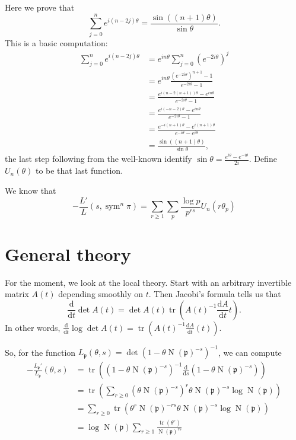 \documentclass{article}
\DeclareMathOperator{\norm}{N}
\DeclareMathOperator{\sym}{sym}
\DeclareMathOperator{\trace}{tr}
\newcommand{\fp}{\mathfrak{p}}
\newcommand{\dd}{\mathrm{d}}
\begin{document}
Here we prove that 
\[
	\sum_{j=0}^n e^{i(n-2j)\theta} = \frac{\sin((n+1)\theta)}{\sin\theta} .
\]
This is a basic computation:
\begin{align*}
	\sum_{j=0}^n e^{i(n-2j)\theta} 
		&= e^{in\theta} \sum_{j=0}^n (e^{-2i\theta})^j \\
		&= e^{i n \theta} \frac{(e^{-2i\theta})^{n+1}-1}{e^{-2i\theta}-1} \\
		&= \frac{e^{i(n-2(n+1))\theta}-e^{i n\theta}}{e^{-2i\theta}-1} \\
		&= \frac{e^{i(-n-2)\theta}-e^{i n\theta}}{e^{-2i\theta}-1} \\
		&= \frac{e^{-i(n+1)\theta} - e^{i(n+1)\theta}}{e^{-i\theta} - e^{i\theta}} \\
		&= \frac{\sin((n+1)\theta)}{\sin\theta} ,
\end{align*}
the last step following from the well-known identify 
$\sin\theta=\frac{e^{i\theta}-e^{-i\theta}}{2i}$. Define $U_n(\theta)$ to be that 
last function. 

We know that 
\[
	-\frac{L'}{L}(s,\sym^n\pi) = \sum_{r\geqslant 1} \sum_p \frac{\log p}{p^{r s}} U_n(r\theta_p)
\]





\section{General theory}

For the moment, we look at the local theory. Start with an arbitrary invertible 
matrix $A(t)$ depending smoothly on $t$. Then Jacobi's formula tells us that 
\[
	\frac{\dd}{\dd t} \det A(t) = \det A(t) \trace\left(A(t)^{-1} \frac{\dd A}{\dd t}{t}\right) .
\]
In other words, 
$\frac{\dd}{\dd t} \log \det A(t) = \trace\left(A(t)^{-1} \frac{\dd A}{\dd t}(t)\right)$. 

So, for the function $L_\fp(\theta,s) = \det(1-\theta \norm(\fp)^{-s})^{-1}$, 
we can compute 
\begin{align*}
	-\frac{L_\fp'}{L_\fp}(\theta,s) 
		&= \trace \left((1-\theta \norm(\fp)^{-s})^{-1} \frac{\dd}{\dd s}(1-\theta \norm(\fp)^{-s})\right) \\
		&= \trace\left(\sum_{r\geqslant 0} (\theta \norm(\fp)^{-s})^r \theta \norm(\fp)^{-s} \log \norm(\fp)\right) \\
		&= \sum_{r\geqslant 0} \trace(\theta^r \norm(\fp)^{-r s} \theta \norm(\fp)^{-s} \log \norm(\fp)) \\
		&= \log\norm(\fp) \sum_{r\geqslant 1} \frac{\trace(\theta^r)}{\norm(\fp)^{rs}}
\end{align*}
\end{document}
